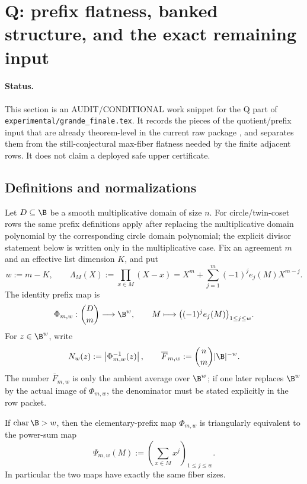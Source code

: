 \section{Q: prefix flatness, banked structure, and the exact remaining input}
\label{sec:q-work}

\paragraph{Status.}
This section is an \textup{AUDIT/CONDITIONAL} work snippet for the Q part of
\texttt{experimental/grande\_finale.tex}.  It records the pieces of the
quotient/prefix input that are already theorem-level in the current raw package
\cite{CAP25v13}, and separates them from the still-conjectural max-fiber
flatness needed by the finite adjacent rows.  It does not claim a deployed safe
upper certificate.

\subsection{Definitions and normalizations}

Let \(D\subseteq \B\) be a smooth multiplicative domain of size \(n\).  For
circle/twin-coset rows the same prefix definitions apply after replacing the
multiplicative domain polynomial by the corresponding circle domain polynomial;
the explicit divisor statement below is written only in the multiplicative
case.  Fix an agreement \(m\) and an effective list dimension \(K\), and put
\[
        w:=m-K,\qquad
        \Lambda_M(X):=\prod_{x\in M}(X-x)
        =X^m+\sum_{j=1}^{m}(-1)^j e_j(M)X^{m-j}.
\]
The identity prefix map is
\[
        \Phi_{m,w}:\binom{D}{m}\longrightarrow \B^w,\qquad
        M\longmapsto \bigl((-1)^j e_j(M)\bigr)_{1\le j\le w}.
\]
For \(z\in\B^w\), write
\[
        N_w(z):=\left|\Phi_{m,w}^{-1}(z)\right|,
        \qquad
        \overline F_{m,w}:=\binom{n}{m}|\B|^{-w}.
\]
The number \(\overline F_{m,w}\) is only the ambient average over \(\B^w\); if
one later replaces \(\B^w\) by the actual image of \(\Phi_{m,w}\), the
denominator must be stated explicitly in the row packet.

\begin{proposition}\label{prop:q-newton-dictionary}
If \(\operatorname{char}\B>w\), then the elementary-prefix map
\(\Phi_{m,w}\) is triangularly equivalent to the power-sum map
\[
        \Psi_{m,w}(M):=
        \left(\sum_{x\in M}x^j\right)_{1\le j\le w}.
\]
In particular the two maps have exactly the same fiber sizes.
\end{proposition}

